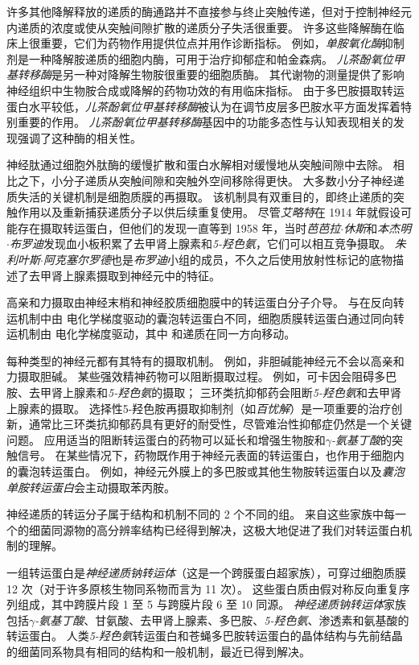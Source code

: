 许多其他降解释放的递质的酶通路并不直接参与终止突触传递，但对于控制神经元内递质的浓度或使从突触间隙扩散的递质分子失活很重要。
许多这些降解酶在临床上很重要，它们为药物作用提供位点并用作诊断指标。
例如，\textit{单胺氧化酶}抑制剂是一种降解胺递质的细胞内酶，可用于治疗抑郁症和帕金森病。
\textit{儿茶酚氧位甲基转移酶}是另一种对降解生物胺很重要的细胞质酶。
其代谢物的测量提供了影响神经组织中生物胺合成或降解的药物功效的有用临床指标。
由于多巴胺摄取转运蛋白水平较低，\textit{儿茶酚氧位甲基转移酶}被认为在调节皮层多巴胺水平方面发挥着特别重要的作用。
\textit{儿茶酚氧位甲基转移酶}基因中的功能多态性与认知表现相关的发现强调了这种酶的相关性。


神经肽通过细胞外肽酶的缓慢扩散和蛋白水解相对缓慢地从突触间隙中去除。
相比之下，小分子递质从突触间隙和突触外空间移除得更快。
大多数小分子神经递质失活的关键机制是细胞质膜的再摄取。
该机制具有双重目的，即终止递质的突触作用以及重新捕获递质分子以供后续重复使用。
尽管\textit{艾略特}在 1914 年就假设可能存在摄取转运蛋白，但他们的发现一直等到 1958 年，当时\textit{芭芭拉$\cdot$休斯}和\textit{本杰明$\cdot$布罗迪}发现血小板积累了去甲肾上腺素和\textit{5-羟色氨}，它们可以相互竞争摄取。
\textit{朱利叶斯$\cdot$阿克塞尔罗德}也是\textit{布罗迪}小组的成员，不久之后使用放射性标记的底物描述了去甲肾上腺素摄取到神经元中的特征。


高亲和力摄取由神经末梢和神经胶质细胞膜中的转运蛋白分子介导。
与在反向转运机制中由  电化学梯度驱动的囊泡转运蛋白不同，细胞质膜转运蛋白通过同向转运机制由  电化学梯度驱动，其中  和递质在同一方向移动。


每种类型的神经元都有其特有的摄取机制。
例如，非胆碱能神经元不会以高亲和力摄取胆碱。
某些强效精神药物可以阻断摄取过程。
例如，可卡因会阻碍多巴胺、去甲肾上腺素和\textit{5-羟色氨}的摄取；
三环类抗抑郁药会阻断\textit{5-羟色氨}和去甲肾上腺素的摄取。
选择性5-羟色胺再摄取抑制剂（如\textit{百忧解}）是一项重要的治疗创新，通常比三环类抗抑郁药具有更好的耐受性，尽管难治性抑郁症仍然是一个关键问题。
应用适当的阻断转运蛋白的药物可以延长和增强生物胺和\textit{$\gamma$-氨基丁酸}的突触信号。
在某些情况下，药物既作用于神经元表面的转运蛋白，也作用于细胞内的囊泡转运蛋白。
例如，神经元外膜上的多巴胺或其他生物胺转运蛋白以及\textit{囊泡单胺转运蛋白}会主动摄取苯丙胺。


神经递质的转运分子属于结构和机制不同的 2 个不同的组。
来自这些家族中每一个的细菌同源物的高分辨率结构已经得到解决，这极大地促进了我们对转运蛋白机制的理解。


一组转运蛋白是\textit{神经递质钠转运体}（这是一个跨膜蛋白超家族），可穿过细胞质膜 12 次（对于许多原核生物同系物而言为 11 次）。
这些蛋白质由假对称反向重复序列组成，其中跨膜片段 1 至 5 与跨膜片段 6 至 10 同源。
\textit{神经递质钠转运体}家族包括\textit{$\gamma$-氨基丁酸}、甘氨酸、去甲肾上腺素、多巴胺、\textit{5-羟色氨}、渗透素和氨基酸的转运蛋白。
人类\textit{5-羟色氨}转运蛋白和苍蝇多巴胺转运蛋白的晶体结构与先前结晶的细菌同系物具有相同的结构和一般机制，最近已得到解决。


